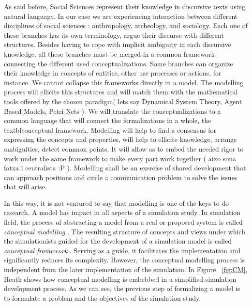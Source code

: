 \documentclass{report}
\begin{document}
As said before, Social Sciences represent their knowledge in discursive texts using natural language. In our case we are experiencing interaction between different disciplines of social sciences : anthropology, archeology, and sociology. Each one of these branches has its own terminology, argue their discurse with different structures. 
Besides having to cope with implicit ambiguity in each discursive knowledge, all these branches must be merged in a common framework connecting the different used conceptualizations. Some branches can organize their knowledge in concepts of entities, other use processes or actions, for instance. We cannot collapse this frameworks directly in a model. The modelling process will ellicite this structures and will match them with the mathematical tools offered by the chosen paradigm( lets say Dynamical System Theory, Agent Based Models, Petri Nets ). We will translate the conceptualizations to a common language that will connect the formalizations in a whole, the textbf{conceptual framework}.  
Modelling will help to find a consensus for expressing the concepts and properties, will help to ellicite knowledge, arrange ambiguities, detect common points. It will allow as to embed the needed rigor to work under the same framework to make every part work together ( aixo sona fatxa i centralista :P ). Modelling shall be an exercise of shared development that can approach positions and circle a communication problem to solve the issues that will arise.


In this way, it is not ventured to say that modelling is one of the keys to do research. A model has impact in all aspects of a simulation study. 
In simulation field, the process of abstracting a model from a real or proposed system is called \textit{conceptual modelling} \cite{Robinson2008}. 
The resulting structure of concepts and views under which the simulationists guided for the development of a simulation model is called 
\textit{conceptual framework} \cite{Balci1988}. Serving as a guide, it facilitates the implementation and significantly reduces its complexity.
However, the conceptual modelling process is independent from the later implementation of the simulation.
In Figure ~\ref{fig:CM}, Heath \cite{Heath2009} shows how conceptual modelling is embebbed in a simplified simulation development process.
As we can see, the previous step of formalizing a model is to formulate a problem and the objectives of the simulation study.\\
\end{document}
